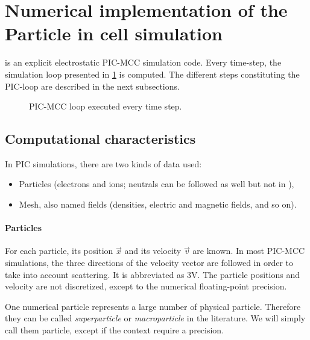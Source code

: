 \section{Numerical implementation of the Particle in cell simulation}

  \LPPic is an explicit electrostatic \ac{PIC}-\ac{MCC} simulation code.
  Every time-step, the simulation loop presented in \cref{fig-picloop} is computed.
  The different steps constituting the PIC-loop are described in the next subsections.
  \begin{figure}[hbt]
    \centering
    \caption{\acs{PIC}-\acs{MCC} loop executed every time step.}
    \label{fig-picloop}
  \end{figure}


  \subsection{Computational characteristics}
    In \ac{PIC} simulations, there are two kinds of data used\string:
    \begin{itemize}
      \item Particles (electrons and ions; neutrals can be followed as well but not in \LPPic),
      \item Mesh, also named fields (densities, electric and magnetic fields, and so on).
    \end{itemize}


    \paragraph{Particles\\}
    For each particle, its position $\vec{x}$ and its velocity $\vec{v}$ are known.
    In most \ac{PIC}-\ac{MCC} simulations, the three directions of the velocity vector are followed in order to take into account scattering.
    It is abbreviated as \acs{3V}.
    The particle positions and velocity are not discretized, except to the numerical floating-point precision.

    One numerical particle represents a large number of physical particle. 
    Therefore they can be called \emph{superparticle} or \emph{macroparticle} in the literature.
    We will simply call them particle, except if the context require a precision.
    
